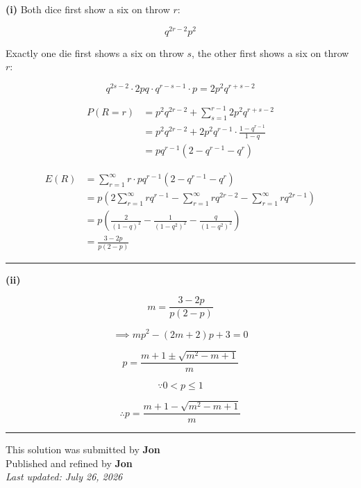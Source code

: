 \documentclass[12pt]{article}
\begin{document}
\newcommand{\ds}{\displaystyle}

\textbf{(i)} Both dice first show a six on throw $r$:

$$q^{2r-2}p^2$$

Exactly one die first shows a six on throw $s$, the other first shows a six on throw $r$:

$$q^{2s-2}\cdot 2pq\cdot q^{r-s-1}\cdot p=2p^2q^{r+s-2}$$

\begin{align*}
P(R=r)
&=p^2q^{2r-2}+\sum_{s=1}^{r-1}2p^2q^{r+s-2}\\
&=p^2q^{2r-2}+2p^2q^{r-1}\cdot\frac{1-q^{r-1}}{1-q}\\
&=pq^{r-1}(2-q^{r-1}-q^r)
\end{align*}

\begin{align*}
E(R)
&=\sum_{r=1}^{\infty}r\cdot pq^{r-1}(2-q^{r-1}-q^r)\\
&=p\left(2\sum_{r=1}^{\infty}rq^{r-1}-\sum_{r=1}^{\infty}rq^{2r-2}-\sum_{r=1}^{\infty}rq^{2r-1}\right)\\
&=p\left(\frac{2}{(1-q)^2}-\frac{1}{(1-q^2)^2}-\frac{q}{(1-q^2)^2}\right)\\
&=\frac{3-2p}{p(2-p)}
\end{align*}

\bigskip\hrule\bigskip

\textbf{(ii)}

$$m=\frac{3-2p}{p(2-p)}$$

$$\implies mp^2-(2m+2)p+3=0$$

$$p=\frac{m+1\pm\sqrt{m^2-m+1}}{m}$$

$$\because 0<p\leq1$$

$$\therefore p=\frac{m+1-\sqrt{m^2-m+1}}{m}$$

\bigskip
\hrule
\begin{center}
    This solution was submitted by \textbf{Jon}\\[4pt]
    Published and refined by \textbf{Jon}\\[8pt]
    \textit{Last updated: July 26, 2026}
\end{center}
\end{document}
